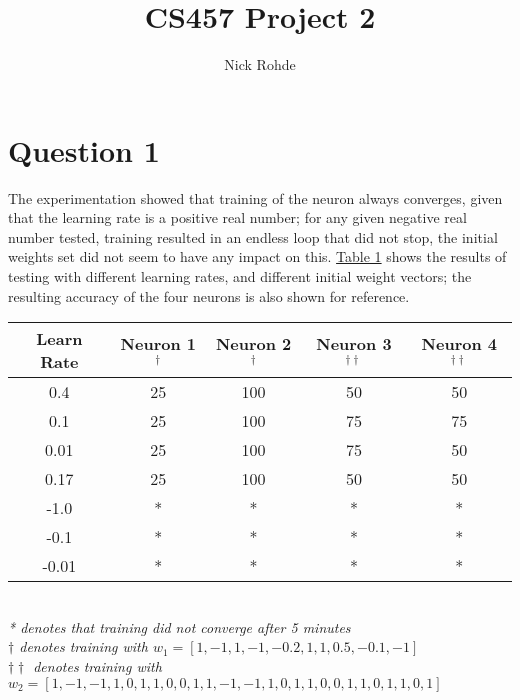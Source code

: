 \documentclass{article}
\title{CS457 Project 2}
\author{Nick Rohde}
\begin{document}
\maketitle


\section{Question 1}
The experimentation showed that training of the neuron always converges, given that the learning rate is a positive real number; for any given negative real number tested, training resulted in an endless loop that did not stop, the initial weights set did not seem to have any impact on this. \hyperref[T1]{Table 1} shows the results of testing with different learning rates, and different initial weight vectors; the resulting accuracy of the four neurons is also shown for reference. \\

\begin{minipage}{\linewidth}
	\centering
	 \label{tab:title} 
	\begin{tabular}{c|cccc}\label{T1}
		Learn Rate      & Neuron 1$^{\dagger}$ 	& Neuron 2$^{\dagger}$ 	& Neuron 3$^{\dagger\dagger}$ 	& Neuron 4$^{\dagger\dagger}$ \\
		\hline
		0.4				& 25	   	& 100	  	& 50		& 50 \\
		0.1				& 25	   	& 100	  	& 75		& 75 \\
		0.01			& 25		& 100		& 75		& 50 \\
		0.17			& 25		& 100		& 50		& 50 \\
		-1.0			& *			& *			& *			& *	 \\
		-0.1			& *			& *			& *			& *	 \\
		-0.01			& *			& *			& *			& *	 \\
	\end{tabular}
	\bigskip\\
	\small
	\textit{* denotes that training did not converge after 5 minutes\\}
	\textit{$\dagger$ denotes training with $w_{1}=[1,-1,1,-1,-0.2,1,1,0.5,-0.1,-1]$\\}
	\textit{$\dagger\dagger$ denotes training with $w_{2}=[1,-1,-1,1,0,1,1,0,0,1,1,-1,-1,1,0,1,1,0,0,1,1,0,1,1,0,1]$\\}
\end{minipage}
\end{document}
